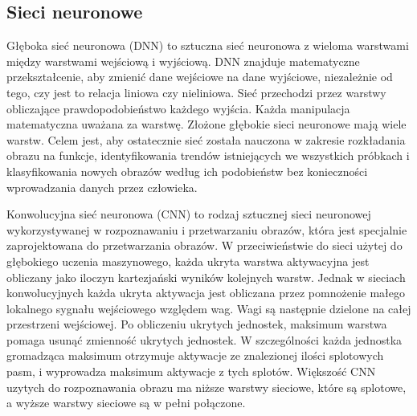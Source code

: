 \documentclass[a4paper,11pt,twoside]{report}
\theoremstyle{definition}
\begin{document}
\subsection{Sieci neuronowe}

Głęboka sieć neuronowa (DNN) to sztuczna sieć neuronowa z wieloma warstwami między warstwami wejściową i wyjściową. DNN znajduje matematyczne przekształcenie, aby zmienić dane wejściowe na dane wyjściowe, niezależnie od tego, czy jest to relacja liniowa czy nieliniowa. Sieć przechodzi przez warstwy obliczające prawdopodobieństwo każdego wyjścia. Każda manipulacja matematyczna uważana za warstwę. Złożone głębokie sieci neuronowe mają wiele warstw. Celem jest, aby ostatecznie sieć została nauczona w zakresie rozkładania obrazu na funkcje, identyfikowania trendów istniejących we wszystkich próbkach i klasyfikowania nowych obrazów według ich podobieństw bez konieczności wprowadzania danych przez człowieka.
\par
Konwolucyjna  sieć neuronowa (CNN) to rodzaj sztucznej sieci neuronowej wykorzystywanej w rozpoznawaniu i przetwarzaniu obrazów, która jest specjalnie zaprojektowana do przetwarzania obrazów. W przeciwieństwie do sieci użytej do głębokiego uczenia maszynowego, każda ukryta warstwa aktywacyjna jest obliczany jako iloczyn kartezjański wyników kolejnych warstw. Jednak w sieciach konwolucyjnych każda ukryta aktywacja jest obliczana przez pomnożenie małego lokalnego sygnału wejściowego względem wag. Wagi są następnie dzielone na całej przestrzeni wejściowej. Po obliczeniu ukrytych jednostek, maksimum warstwa pomaga usunąć zmienność ukrytych jednostek. W szczególności każda jednostka gromadząca maksimum otrzymuje aktywacje ze znalezionej ilości splotowych pasm, i wyprowadza maksimum aktywacje z tych splotów. Większość CNN uzytych do rozpoznawania obrazu ma niższe warstwy sieciowe, które są splotowe, a wyższe warstwy sieciowe są w pełni połączone.
\end{document}
